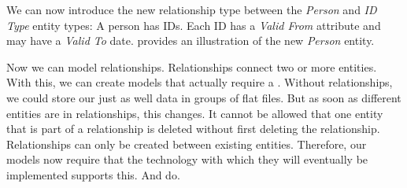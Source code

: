 We can now introduce the new relationship type between the \emph{Person} and \emph{ID Type} entity types:
A person has IDs.
Each ID has a \emph{Valid From} attribute and may have a \emph{Valid To} date.
 provides an illustration of the new \emph{Person} entity.

Now we can model relationships.
Relationships connect two or more entities.
With this, we can create models that actually require a \db.
Without relationships, we could store our just as well data in groups of flat files.
But as soon as different entities are in relationships, this changes.
It cannot be allowed that one entity that is part of a relationship is deleted without first deleting the relationship.
Relationships can only be created between existing entities.
Therefore, our models now require that the technology with which they will eventually be implemented supports this.
And  do.%
\FloatBarrier%
\endhsection%
%
